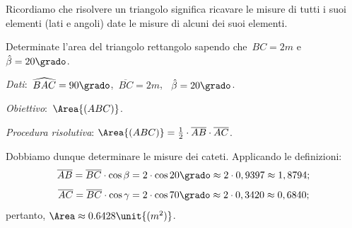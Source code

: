 Ricordiamo che risolvere un triangolo significa ricavare le misure di tutti i 
suoi elementi (lati e angoli) date le misure di alcuni dei suoi elementi.

 \begin{esempio}
Determinate l'area del triangolo rettangolo sapendo che~\({BC}=2\unit{m}\) 
e~\(\hat{\beta} =20\grado\).

\emph{Dati}:~\(\widehat{BAC}=90\grado\),\quad~\(\overline{BC}=2\unit{m}\),
\quad~\(\hat{\beta}=20\grado\).

\emph{Obiettivo}:~\(\Area{(ABC)}\).

\emph{Procedura risolutiva}:
\(\Area{(ABC)}=\frac{1}{2}\cdot \overline{AB}\cdot \overline{AC}\).

Dobbiamo dunque determinare le misure dei cateti. Applicando le definizioni:
\[\overline{AB}=\overline{BC}\cdot {\cos \beta}=2\cdot 
{\cos 20\grado} \approx2\cdot 0,9397\approx1,8794;\]
\[\overline{AC}=\overline{BC}\cdot {\cos \gamma}=2\cdot 
{\cos 70\grado} \approx2\cdot 0,3420\approx0,6840;\]
pertanto, \(\Area\approx0.6428\unit{(m^{2})}\).
 \end{esempio}

